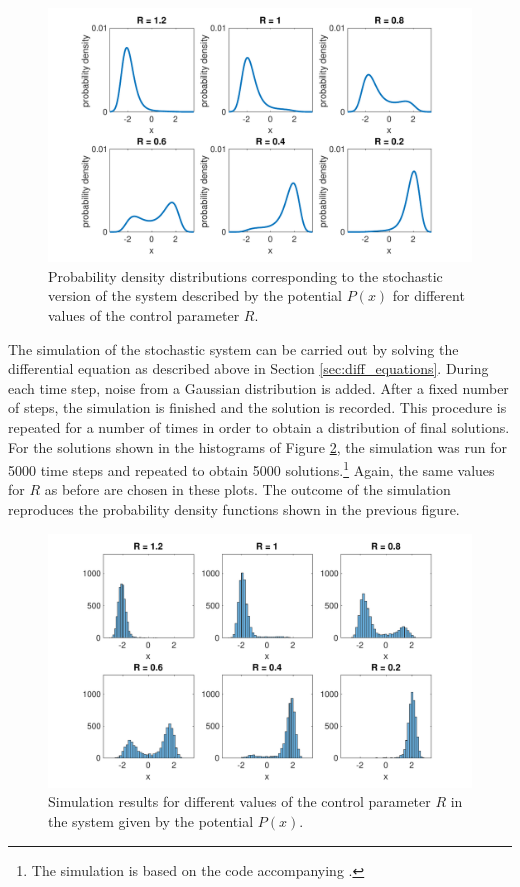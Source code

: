 \begin{figure}
\includegraphics[width=\textwidth]{figures/ch3/gafos_benus_probabilities.pdf}
\caption{Probability density distributions corresponding to the stochastic version of the system described by the potential $P(x)$ for different values of the control parameter $R$.}
\label{fig:gafos_benus_probabilities}
\end{figure}

The simulation of the stochastic system can be carried out by solving the differential equation as described above in Section \ref{sec:diff_equations}. During each time step, noise from a Gaussian distribution is added. After a fixed number of steps, the simulation is finished and the solution is recorded. This procedure is repeated for a number of times in order to obtain a distribution of final solutions. For the solutions shown in the histograms of Figure \ref{fig:gafos_benus_simulation}, the simulation was run for 5000 time steps and repeated to obtain 5000 solutions.\footnote{The simulation is based on the code accompanying \citet{Gafos2006}.} Again, the same values for $R$ as before are chosen in these plots. The outcome of the simulation reproduces the probability density functions shown in the previous figure.

\begin{figure}[t]
\includegraphics[width=\textwidth]{figures/ch3/gafos_benus_simulation.pdf}
\caption{Simulation results for different values of the control parameter $R$ in the system given by the potential $P(x)$.}
\label{fig:gafos_benus_simulation}
\end{figure}

